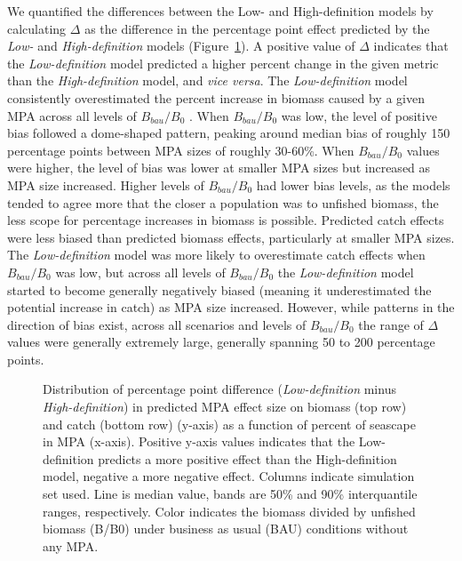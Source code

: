 \documentclass[
  default,
  lineno,
  referee]{sn-jnl}
\begin{document}
We quantified the differences between the Low- and High-definition
models by calculating \(\Delta\) as the difference in the percentage
point effect predicted by the \emph{Low-} and \emph{High-definition}
models (Figure~\ref{fig-delta}). A positive value of \(\Delta\)
indicates that the \emph{Low-definition} model predicted a higher
percent change in the given metric than the \emph{High-definition}
model, and \emph{vice versa}. The \emph{Low-definition} model
consistently overestimated the percent increase in biomass caused by a
given MPA across all levels of \(B_{bau}/B_0\) . When \(B_{bau}/B_0\)
was low, the level of positive bias followed a dome-shaped pattern,
peaking around median bias of roughly 150 percentage points between MPA
sizes of roughly 30-60\%. When \(B_{bau}/B_0\) values were higher, the
level of bias was lower at smaller MPA sizes but increased as MPA size
increased. Higher levels of \(B_{bau}/B_0\) had lower bias levels, as
the models tended to agree more that the closer a population was to
unfished biomass, the less scope for percentage increases in biomass is
possible. Predicted catch effects were less biased than predicted
biomass effects, particularly at smaller MPA sizes. The
\emph{Low-definition} model was more likely to overestimate catch
effects when \(B_{bau}/B_0\) was low, but across all levels of
\(B_{bau}/B_0\) the \emph{Low-definition} model started to become
generally negatively biased (meaning it underestimated the potential
increase in catch) as MPA size increased. However, while patterns in the
direction of bias exist, across all scenarios and levels of
\(B_{bau}/B_0\) the range of \(\Delta\) values were generally extremely
large, generally spanning 50 to 200 percentage points.

\begin{figure}


\caption{\label{fig-delta}Distribution of percentage point difference
(\emph{Low-definition} minus \emph{High-definition}) in predicted MPA
effect size on biomass (top row) and catch (bottom row) (y-axis) as a
function of percent of seascape in MPA (x-axis). Positive y-axis values
indicates that the Low-definition predicts a more positive effect than
the High-definition model, negative a more negative effect. Columns
indicate simulation set used. Line is median value, bands are 50\% and
90\% interquantile ranges, respectively. Color indicates the biomass
divided by unfished biomass (B/B0) under business as usual (BAU)
conditions without any MPA.}

\end{figure}%
\end{document}
